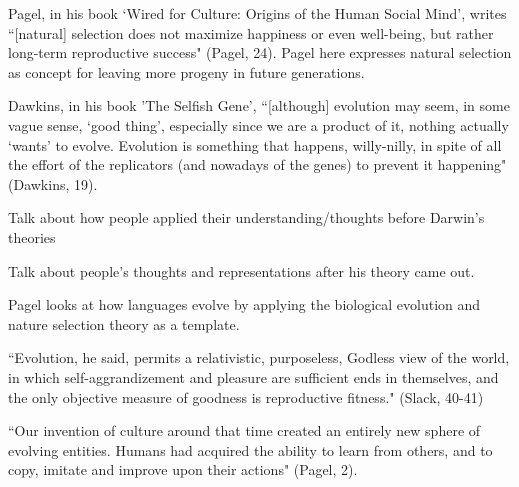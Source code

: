 \documentclass[11pt, oneside]{article}
\begin{document}
\par Pagel, in his book `Wired for Culture: Origins of the Human Social Mind', writes ``[natural] selection does not maximize happiness or even well-being, but rather long-term reproductive success" (Pagel, 24). Pagel here expresses natural selection as concept for leaving more progeny in future generations. 

\par Dawkins, in his book 'The Selfish Gene', ``[although] evolution may seem, in some vague sense, `good thing', especially since we are a product of it, nothing actually `wants' to evolve. Evolution is something that happens, willy-nilly, in spite of all the effort of the replicators (and nowadays of the genes) to prevent it happening" (Dawkins, 19).




\par Talk about how people applied their understanding/thoughts before Darwin's theories



% 

\par Talk about people's thoughts and representations after his theory came out.

\par Pagel looks at how languages evolve by applying the biological evolution and nature selection theory as a template. 

``Evolution, he said, permits a relativistic, purposeless, Godless view of the world, in which self-aggrandizement and pleasure are sufficient ends in themselves, and the only objective measure of goodness is reproductive fitness." (Slack, 40-41)

``Our invention of culture around that time created an entirely new sphere of evolving entities. Humans had acquired the ability to learn from others, and to copy, imitate and improve upon their actions" (Pagel, 2).
\end{document}
